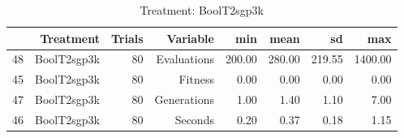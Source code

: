 \begin{table}[ht]
\centering
\begin{tabular}{rrrrrrrr}
  \hline
 & Treatment & Trials & Variable & min & mean & sd & max \\ 
  \hline
48 & BoolT2sgp3k &  80 & Evaluations & 200.00 & 280.00 & 219.55 & 1400.00 \\ 
  45 & BoolT2sgp3k &  80 & Fitness & 0.00 & 0.00 & 0.00 & 0.00 \\ 
  47 & BoolT2sgp3k &  80 & Generations & 1.00 & 1.40 & 1.10 & 7.00 \\ 
  46 & BoolT2sgp3k &  80 & Seconds & 0.20 & 0.37 & 0.18 & 1.15 \\ 
   \hline
\end{tabular}
\caption{Treatment: BoolT2sgp3k} 
\end{table}
